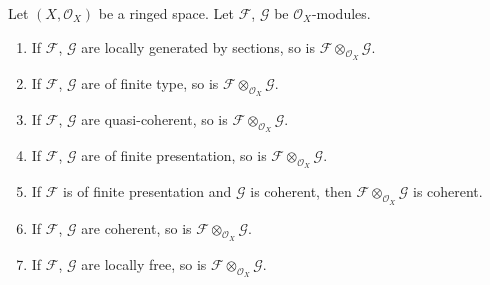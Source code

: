 \begin{lemma}
\label{lemma-tensor-product-permanence}
Let $(X, \mathcal{O}_X)$ be a ringed space.
Let $\mathcal{F}$, $\mathcal{G}$ be $\mathcal{O}_X$-modules.
\begin{enumerate}
\item If $\mathcal{F}$, $\mathcal{G}$ are locally generated
by sections, so is $\mathcal{F} \otimes_{\mathcal{O}_X} \mathcal{G}$.
\item If $\mathcal{F}$, $\mathcal{G}$ are of finite type,
so is $\mathcal{F} \otimes_{\mathcal{O}_X} \mathcal{G}$.
\item If $\mathcal{F}$, $\mathcal{G}$ are quasi-coherent,
so is $\mathcal{F} \otimes_{\mathcal{O}_X} \mathcal{G}$.
\item If $\mathcal{F}$, $\mathcal{G}$ are of finite presentation,
so is $\mathcal{F} \otimes_{\mathcal{O}_X} \mathcal{G}$.
\item If $\mathcal{F}$ is of finite presentation and $\mathcal{G}$ is coherent,
then $\mathcal{F} \otimes_{\mathcal{O}_X} \mathcal{G}$ is coherent.
\item If $\mathcal{F}$, $\mathcal{G}$ are coherent,
so is $\mathcal{F} \otimes_{\mathcal{O}_X} \mathcal{G}$.
\item If $\mathcal{F}$, $\mathcal{G}$ are locally free,
so is $\mathcal{F} \otimes_{\mathcal{O}_X} \mathcal{G}$.
\end{enumerate}
\end{lemma}

